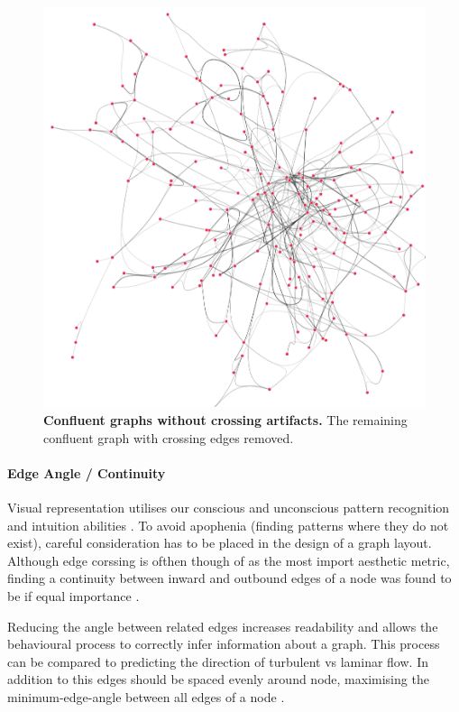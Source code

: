 \begin{figure}[H]
     \centering
     \includegraphics[width=.6\textwidth]{figures_c1/layout/confluent/4.png}
        \caption{\textbf{Confluent graphs without crossing artifacts.} The remaining confluent graph with crossing edges removed. }
      \label{fig:conf4}
\end{figure}



\paragraph{ Edge Angle / Continuity}
Visual representation utilises our conscious and unconscious pattern recognition and intuition abilities \cite{pattern}. To avoid apophenia (finding patterns where they do not exist), careful  consideration has to be placed in the design of a graph layout. 
Although edge corssing is ofthen though of as the most import aesthetic metric, finding a continuity between inward and outbound edges of a node was found to be if equal importance \cite{continuity}.

Reducing the angle between related edges increases readability and allows the behavioural process to correctly infer information about a graph. This process can be compared to predicting the direction of turbulent vs laminar flow. In addition to this edges should be spaced evenly around node, maximising the minimum-edge-angle between all edges of a node \cite{aestheticsgraphvis}. 



